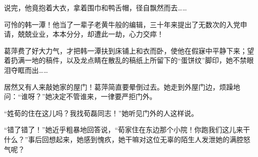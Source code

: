 \par 说完，他竟抱着大衣，拿着围巾和鸭舌帽，径自飘然而去……
\par 可怜的韩一潭！他当了一辈子老黄牛般的编辑，三十年来提出了无数次的入党申请，兢兢业业，本本分分，却遭此一劫，心力交瘁！
\par 葛萍费了好大力气，才把韩一潭扶到床铺上和衣而卧，使他在假寐中平静下来；望着扔满一地的稿件，以及龙点睛在散乱的稿纸上所留下的“蛋饼纹”脚印，她不禁眼泪夺眶而出……
\par 居然又有人来敲她家的屋门！葛萍简直要晕倒过去。她走到外屋门边，烦躁地问：“谁呀？”她决定不管谁来，一律要严拒门外。
\par “姓荀的住在这儿吗？我找荀磊同志！”她听见门外的人这样说。
\par “错了错了！”她近乎粗暴地回答说，“荀家住在东边那个小院！你跑我们这儿来干什么？”事后回想起来，她感到愧疚，她干嘛对这位无辜的陌生人发泄她的满腔怒气呢？




